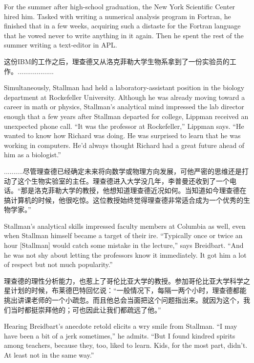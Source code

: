 \ifdefined\eng
For the summer after high-school graduation, the New York Scientific Center hired him.  Tasked with writing a numerical analysis program in Fortran, he finished that in a few weeks, acquiring such a distaste for the Fortran language that he vowed never to write anything in it again.  Then he spent the rest of the summer writing a text-editor in APL.
\fi

\ifdefined\chs
这份IBM的工作之后，理查德又从洛克菲勒大学生物系拿到了一份实验员的工作。...................
\fi

\ifdefined\eng
Simultaneously, Stallman had held a laboratory-assistant position in the biology department at Rockefeller University. Although he was already moving toward a career in math or physics, Stallman's analytical mind impressed the lab director enough that a few years after Stallman departed for college, Lippman received an unexpected phone call. ``It was the professor at Rockefeller,'' Lippman says. ``He wanted to know how Richard was doing. He was surprised to learn that he was working in computers. He'd always thought Richard had a great future ahead of him as a biologist.''
\fi

\ifdefined\chs
..........尽管理查德已经确定未来将向数学或物理方向发展，可他严密的思维还是打动了这个生物实验室的主任。理查德进入大学没几年，李普曼还收到了一个电话。“那是洛克菲勒大学的教授，他想知道理查德近况如何。当知道如今理查德在搞计算机的时候，他很吃惊。这位教授始终觉得理查德非常适合成为一个优秀的生物学家。”
\fi

\ifdefined\eng
Stallman's analytical skills impressed faculty members at Columbia as well, even when Stallman himself became a target of their ire. ``Typically once or twice an hour [Stallman] would catch some mistake in the lecture,'' says Breidbart. ``And he was not shy about letting the professors know it immediately. It got him a lot of respect but not much popularity.''
\fi

\ifdefined\chs
理查德的理性分析能力，也惹上了哥伦比亚大学的教授。参加哥伦比亚大学科学之星计划的时候，布莱德巴特回忆说：“一般情况下，每隔一两个小时，理查德都能挑出讲课老师的一个小疏忽。而且他总会当面把这个问题指出来。就因为这个，我们当时都挺崇拜他的；可也因此让我们都疏远了他。”
\fi

\ifdefined\eng
Hearing Breidbart's anecdote retold elicits a wry smile from Stallman. ``I may have been a bit of a jerk sometimes,'' he admits. ``But I found kindred spirits among teachers, because they, too, liked to learn. Kids, for the most part, didn't. At least not in the same way.''
\fi

